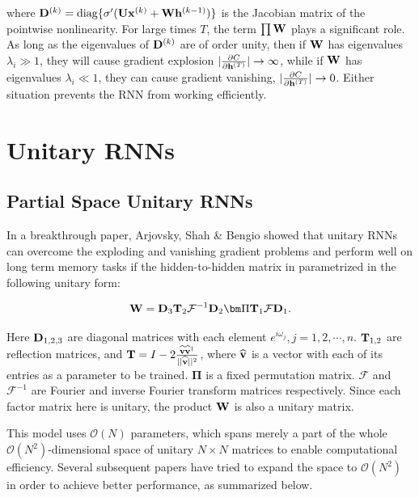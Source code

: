  
where ${\bf D}^{(k)}= {\rm diag}\{\sigma'({\bf U}{\bf x}^{(k)}+{\bf W}{\bf h}^{(k-1)})\}$ is the Jacobian matrix of the pointwise nonlinearity. For large times $T$, the term $\prod {\bf W}$ plays a significant role. As long as the eigenvalues of ${\bf D}^{(k)}$ are of order unity, then if ${\bf W}$ has eigenvalues $\lambda_i\gg 1$, they will cause gradient explosion 
$|\frac{\partial C}{\partial{\bf h}^{(T)}}|\rightarrow \infty$,
while if ${\bf W}$ has eigenvalues $\lambda_i\ll 1$, they can cause gradient vanishing, 
$|\frac{\partial C}{\partial{\bf h}^{(T)}}|\rightarrow 0$. Either situation prevents the RNN from working efficiently.

\section{Unitary RNNs}

\subsection{Partial Space Unitary RNNs}

In a breakthrough paper, Arjovsky, Shah \& Bengio  \cite{arjovsky2015unitary} showed that unitary RNNs can overcome the exploding and vanishing gradient problems and perform well on long term memory tasks if the hidden-to-hidden matrix in parametrized in the following unitary form:

\begin{equation}
{\bf W} = {\bf D}_3{\bf T}_2\mathcal{F}^{-1}{\bf D}_2{\bm\Pi}{\bf T}_1\mathcal{F}{\bf D}_1.
\end{equation}

Here ${\bf D}_{1,2,3}$ are diagonal matrices with each element $e^{i\omega_j}, j=1,2,\cdots,n$. ${\bf T}_{1,2}$ are reflection matrices, and ${\bf T}=I-2\frac{\widehat{\bf v}\widehat{\bf v}^\dagger}{||\widehat{\bf v}||^2}$, where $\widehat{\bf v}$ is a vector with each of its entries as a parameter to be trained. $\bm{\Pi}$ is a fixed permutation matrix. $\mathcal{F}$ and $\mathcal{F}^{-1}$ are Fourier and inverse Fourier transform matrices respectively. Since each factor matrix here is unitary, the product ${\bf W}$ is also a unitary matrix.

This model uses $\mathcal{O}(N)$ parameters, which spans merely a part of the whole $\mathcal{O}(N^2)$-dimensional space of unitary $N\times N$ matrices to enable computational efficiency. Several subsequent papers have tried to expand the space to $\mathcal{O}(N^2)$ in order to achieve better performance, as summarized below.

